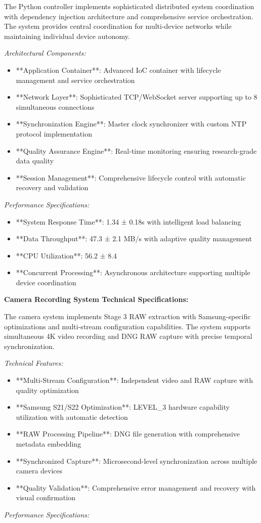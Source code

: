 \documentclass[11pt,a4paper]{article}
\begin{document}
The Python controller implements sophisticated distributed system coordination with dependency injection architecture
and comprehensive service orchestration. The system provides central coordination for multi-device networks while
maintaining individual device autonomy.

\textit{Architectural Components:}

\begin{itemize}
\item **Application Container**: Advanced IoC container with lifecycle management and service orchestration
\item **Network Layer**: Sophisticated TCP/WebSocket server supporting up to 8 simultaneous connections
\item **Synchronization Engine**: Master clock synchronizer with custom NTP protocol implementation
\item **Quality Assurance Engine**: Real-time monitoring ensuring research-grade data quality
\item **Session Management**: Comprehensive lifecycle control with automatic recovery and validation

\end{itemize}
\textit{Performance Specifications:}

\begin{itemize}
\item **System Response Time**: 1.34 ± 0.18s with intelligent load balancing
\item **Data Throughput**: 47.3 ± 2.1 MB/s with adaptive quality management
\item **CPU Utilization**: 56.2 ± 8.4%
\item **Concurrent Processing**: Asynchronous architecture supporting multiple device coordination

\end{itemize}
\textbf{Camera Recording System Technical Specifications:}

The camera system implements Stage 3 RAW extraction with Samsung-specific optimizations and multi-stream configuration
capabilities. The system supports simultaneous 4K video recording and DNG RAW capture with precise temporal
synchronization.

\textit{Technical Features:}

\begin{itemize}
\item **Multi-Stream Configuration**: Independent video and RAW capture with quality optimization
\item **Samsung S21/S22 Optimization**: LEVEL_3 hardware capability utilization with automatic detection
\item **RAW Processing Pipeline**: DNG file generation with comprehensive metadata embedding
\item **Synchronized Capture**: Microsecond-level synchronization across multiple camera devices
\item **Quality Validation**: Comprehensive error management and recovery with visual confirmation

\end{itemize}
\textit{Performance Specifications:}
\end{document}
